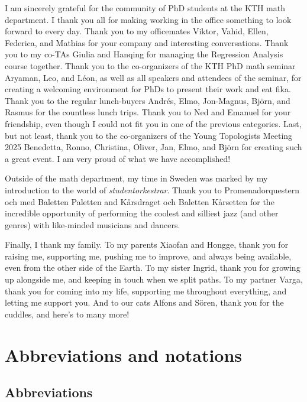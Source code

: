 I am sincerely grateful for the community of PhD students at the KTH math department. I thank you all for making working in the office something to look forward to every day. Thank you to my officemates Viktor, Vahid, Ellen, Federica, and Mathias for your company and interesting conversations. Thank you to my co-TAs Giulia and Hanqing for managing the Regression Analysis course together. Thank you to the co-organizers of the KTH PhD math seminar Aryaman, Leo, and Léon, as well as all speakers and attendees of the seminar, for creating a welcoming environment for PhDs to present their work and eat fika. Thank you to the regular lunch-buyers Andrés, Elmo, Jon-Magnus, Björn, and Rasmus for the countless lunch trips. Thank you to Ned and Emanuel for your friendship, even though I could not fit you in one of the previous categories. Last, but not least, thank you to the co-organizers of the Young Topologists Meeting 2025 Benedetta, Ronno, Christina, Oliver, Jan, Elmo, and Björn for creating such a great event. I am very proud of what we have accomplished!

Outside of the math department, my time in Sweden was marked by my introduction to the world of \textit{studentorkestrar}. Thank you to Promenadorquestern och med Baletten Paletten and Kårsdraget och Baletten Kårsetten for the incredible opportunity of performing the coolest and silliest jazz (and other genres) with like-minded musicians and dancers.

Finally, I thank my family. To my parents Xiaofan and Hongge, thank you for raising me, supporting me, pushing me to improve, and always being available, even from the other side of the Earth. To my sister Ingrid, thank you for growing up alongside me, and keeping in touch when we split paths. To my partner Varga, thank you for coming into my life, supporting me throughout everything, and letting me support you. And to our cats Alfons and Sören, thank you for the cuddles, and here's to many more!

\tableofcontents

\renewcommand*{\listfigurename}{Figures}
\listoffigures


\chapter{Abbreviations and notations}

\section*{Abbreviations}

